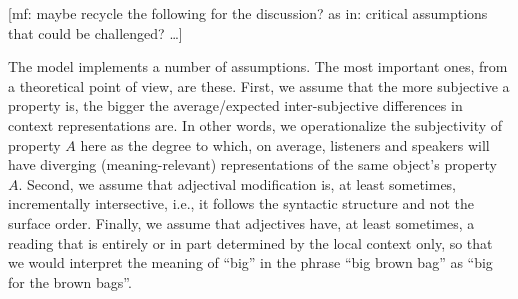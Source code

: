 \documentclass[10pt,a4paper]{article}
\newcommand{\mf}[1]{\textcolor{BrickRed}{[mf: #1]}}
\begin{document}
\bigskip
\bigskip
\bigskip

\mf{maybe recycle the following for the discussion? as in: critical assumptions that could be challenged? \dots}

The model implements a number of assumptions. The most important ones, from a theoretical point of view, are these. First, we assume that the more subjective a property is, the bigger the average/expected inter-subjective differences in context representations are. In other words, we operationalize the subjectivity of property $A$ here as the degree to which, on average, listeners and speakers will have diverging (meaning-relevant) representations of the same object's property $A$. Second, we assume that adjectival modification is, at least sometimes, incrementally intersective, i.e., it follows the syntactic structure and not the surface order. Finally, we assume that adjectives have, at least sometimes, a reading that is entirely or in part determined by the local context only, so that we would interpret the meaning of ``big''  in the phrase ``big brown bag'' as ``big for the brown bags''.

\bigskip






\setlength{\bibleftmargin}{.125in}
\setlength{\bibindent}{-\bibleftmargin}


\end{document}
